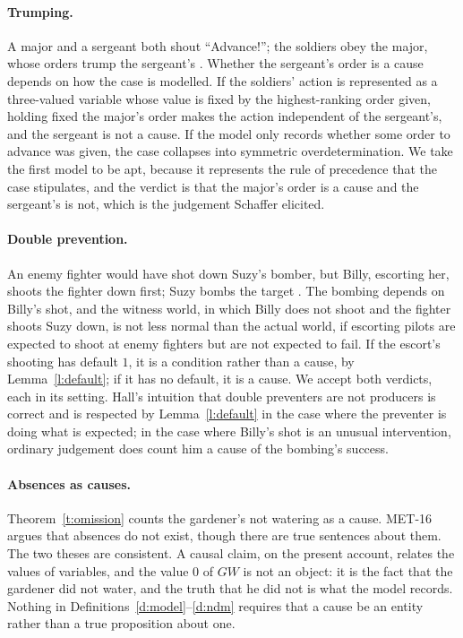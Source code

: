 \documentclass{situationist-preprint}
\begin{document}
\paragraph{Trumping.} A major and a sergeant both shout \enquote{Advance!}; the soldiers obey the major, whose orders trump the sergeant's \citep{Schaffer2000}. Whether the sergeant's order is a cause depends on how the case is modelled. If the soldiers' action is represented as a three-valued variable whose value is fixed by the highest-ranking order given, holding fixed the major's order makes the action independent of the sergeant's, and the sergeant is not a cause. If the model only records whether some order to advance was given, the case collapses into symmetric overdetermination. We take the first model to be apt, because it represents the rule of precedence that the case stipulates, and the verdict is that the major's order is a cause and the sergeant's is not, which is the judgement Schaffer elicited.

\paragraph{Double prevention.} An enemy fighter would have shot down Suzy's bomber, but Billy, escorting her, shoots the fighter down first; Suzy bombs the target \citep{Hall2004}. The bombing depends on Billy's shot, and the witness world, in which Billy does not shoot and the fighter shoots Suzy down, is not less normal than the actual world, if escorting pilots are expected to shoot at enemy fighters but are not expected to fail. If the escort's shooting has default $1$, it is a condition rather than a cause, by Lemma~\ref{l:default}; if it has no default, it is a cause. We accept both verdicts, each in its setting. Hall's intuition that double preventers are not producers is correct and is respected by Lemma~\ref{l:default} in the case where the preventer is doing what is expected; in the case where Billy's shot is an unusual intervention, ordinary judgement does count him a cause of the bombing's success.

\paragraph{Absences as causes.} Theorem~\ref{t:omission} counts the gardener's not watering as a cause. MET-16 argues that absences do not exist, though there are true sentences about them. The two theses are consistent. A causal claim, on the present account, relates the values of variables, and the value $0$ of $\mathit{GW}$ is not an object: it is the fact that the gardener did not water, and the truth that he did not is what the model records. Nothing in Definitions~\ref{d:model}--\ref{d:ndm} requires that a cause be an entity rather than a true proposition about one.
\end{document}
